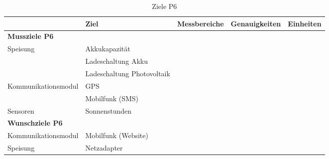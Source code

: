 \begin{landscape}
\begin{table}[htbp]
  \centering
  \caption{Ziele P6}
    \begin{tabular}{l|l|r|r|r}
          & \textbf{Ziel} & \multicolumn{1}{l|}{\textbf{Messbereiche}} & \multicolumn{1}{l|}{\textbf{Genauigkeiten}} & \multicolumn{1}{l}{\textbf{Einheiten}} \\
    \toprule
    \multicolumn{1}{l}{\textbf{Mussziele P6}} & \multicolumn{1}{r}{} & \multicolumn{1}{r}{} & \multicolumn{1}{r}{} &  \\
    \toprule
    Speisung & Akkukapazität &       &       &  \\
\cline{2-5}          & Ladeschaltung Akku &       &       &  \\
\cline{2-5}           & Ladeschaltung Photovoltaik &       &       &  \\
    \hline
    Kommunikationsmodul & GPS   &       &       &  \\
\cline{2-5}          & Mobilfunk (SMS) &       &       &  \\
\hline
Sensoren & Sonnenstunden &       &       &  \\
    \bottomrule
    \multicolumn{1}{l}{\textbf{Wunschziele P6}} & \multicolumn{1}{r}{} & \multicolumn{1}{r}{} & \multicolumn{1}{r}{} &  \\
    \toprule
    Kommunikationsmodul & Mobilfunk (Website) &       &       &  \\
    \hline
    Speisung & Netzadapter &       &       &  \\
    \bottomrule
    \end{tabular}%
  \label{tab:ZieleP6}%
\end{table}%
\end{landscape}

